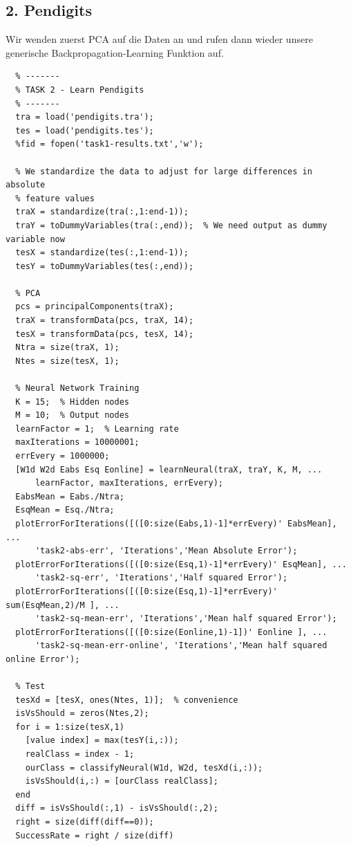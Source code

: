 \documentclass{article}
\begin{document}
\subsection*{2. Pendigits}
  Wir wenden zuerst PCA auf die Daten an und rufen dann wieder unsere generische Backpropagation-Learning Funktion auf.\\
  \begin{lstlisting}
  % -------
  % TASK 2 - Learn Pendigits
  % -------
  tra = load('pendigits.tra');
  tes = load('pendigits.tes');
  %fid = fopen('task1-results.txt','w');
  
  % We standardize the data to adjust for large differences in absolute
  % feature values
  traX = standardize(tra(:,1:end-1));
  traY = toDummyVariables(tra(:,end));  % We need output as dummy variable now
  tesX = standardize(tes(:,1:end-1));
  tesY = toDummyVariables(tes(:,end));
  
  % PCA
  pcs = principalComponents(traX);
  traX = transformData(pcs, traX, 14);
  tesX = transformData(pcs, tesX, 14);
  Ntra = size(traX, 1);
  Ntes = size(tesX, 1);
  
  % Neural Network Training
  K = 15;  % Hidden nodes
  M = 10;  % Output nodes
  learnFactor = 1;  % Learning rate
  maxIterations = 10000001;
  errEvery = 1000000;
  [W1d W2d Eabs Esq Eonline] = learnNeural(traX, traY, K, M, ...
      learnFactor, maxIterations, errEvery);
  EabsMean = Eabs./Ntra;
  EsqMean = Esq./Ntra;
  plotErrorForIterations([([0:size(Eabs,1)-1]*errEvery)' EabsMean], ...
      'task2-abs-err', 'Iterations','Mean Absolute Error');
  plotErrorForIterations([([0:size(Esq,1)-1]*errEvery)' EsqMean], ...
      'task2-sq-err', 'Iterations','Half squared Error');
  plotErrorForIterations([([0:size(Esq,1)-1]*errEvery)' sum(EsqMean,2)/M ], ...
      'task2-sq-mean-err', 'Iterations','Mean half squared Error');
  plotErrorForIterations([([0:size(Eonline,1)-1])' Eonline ], ...
      'task2-sq-mean-err-online', 'Iterations','Mean half squared online Error');
  
  % Test
  tesXd = [tesX, ones(Ntes, 1)];  % convenience
  isVsShould = zeros(Ntes,2);
  for i = 1:size(tesX,1)
    [value index] = max(tesY(i,:));
    realClass = index - 1;
    ourClass = classifyNeural(W1d, W2d, tesXd(i,:));
    isVsShould(i,:) = [ourClass realClass];
  end
  diff = isVsShould(:,1) - isVsShould(:,2);
  right = size(diff(diff==0));
  SuccessRate = right / size(diff)
  \end{lstlisting}
  
\end{document}
